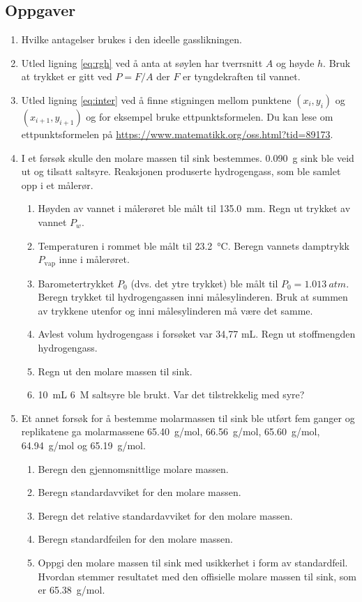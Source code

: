 	\subsection{Oppgaver}
	\begin{enumerate}
		\item Hvilke antagelser brukes i den ideelle gasslikningen.
		\item Utled ligning \eqref{eq:rgh} ved å anta at søylen har tverrsnitt $A$ og høyde $h$. Bruk at trykket er gitt ved $P=F/A$ der $F$ er tyngdekraften til vannet.	
		\item Utled ligning  \eqref{eq:inter} ved å finne stigningen mellom punktene $(x_i, y_i)$ og $(x_{i+1}, y_{i+1})$ og for eksempel bruke ettpunktsformelen. Du kan lese om ettpunktsformelen på \url{https://www.matematikk.org/oss.html?tid=89173}.		
		\item I et førsøk skulle den molare massen til sink bestemmes. \SI{0.090}{g} sink ble veid ut og tilsatt saltsyre. Reaksjonen produserte hydrogengass, som ble samlet opp i et målerør.
		\begin{enumerate}
			\item Høyden av vannet i målerøret ble målt til \SI{135.0}{mm}. Regn ut trykket av vannet $P_w$.
			\item Temperaturen i rommet ble målt til \SI{23.2}{\degreeCelsius}. Beregn vannets damptrykk $P_\mathrm{vap}$ inne i målerøret.
			\item Barometertrykket $P_0$ (dvs. det ytre trykket) ble målt til $P_0=\SI{1.013}{atm}$. Beregn trykket til hydrogengassen inni målesylinderen. Bruk at summen av trykkene utenfor og inni målesylinderen må være det samme.
			\item Avlest volum hydrogengass i forsøket var 34,77 mL. Regn ut stoffmengden hydrogengass.
			\item Regn ut den molare massen til sink.
			\item \SI{10}{mL} \SI{6}{M} saltsyre ble brukt. Var det tilstrekkelig med syre?
		\end{enumerate}
		\item Et annet forsøk for å bestemme molarmassen til sink ble utført fem ganger og replikatene ga molarmassene \SI{65,40}{g/mol}, \SI{66,56}{g/mol}, \SI{65,60}{g/mol}, \SI{64,94}{g/mol} og \SI{65,19}{g/mol}.
		\begin{enumerate}
			\item Beregn den gjennomsnittlige molare massen.
			\item Beregn standardavviket for den molare massen.
			\item Beregn det relative standardavviket for den molare massen.
			\item Beregn standardfeilen for den molare massen.
			\item Oppgi den molare massen til sink med usikkerhet i form av standardfeil. Hvordan stemmer resultatet med den offisielle molare massen til sink, som er \SI{65.38}{g/mol}.
		\end{enumerate}
	\end{enumerate}
	

